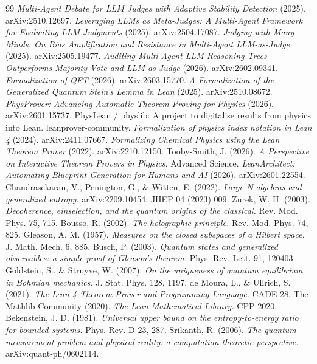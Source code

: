 \documentclass[11pt]{article}
\begin{document}
\begin{thebibliography}{99}
 \emph{Multi-Agent Debate for LLM Judges with Adaptive Stability Detection} (2025). arXiv:2510.12697.
 \emph{Leveraging LLMs as Meta-Judges: A Multi-Agent Framework for Evaluating LLM Judgments} (2025). arXiv:2504.17087.
 \emph{Judging with Many Minds: On Bias Amplification and Resistance in Multi-Agent LLM-as-Judge} (2025). arXiv:2505.19477.
 \emph{Auditing Multi-Agent LLM Reasoning Trees Outperforms Majority Vote and LLM-as-Judge} (2026). arXiv:2602.09341.
 \emph{Formalization of QFT} (2026). arXiv:2603.15770.
 \emph{A Formalization of the Generalized Quantum Stein's Lemma in Lean} (2025). arXiv:2510.08672.
 \emph{PhysProver: Advancing Automatic Theorem Proving for Physics} (2026). arXiv:2601.15737.
 PhysLean / physlib: A project to digitalise results from physics into Lean. leanprover-community.
 \emph{Formalization of physics index notation in Lean 4} (2024). arXiv:2411.07667.
 \emph{Formalizing Chemical Physics using the Lean Theorem Prover} (2022). arXiv:2210.12150.
 Tooby-Smith, J. (2026). \emph{A Perspective on Interactive Theorem Provers in Physics.} Advanced Science.
 \emph{LeanArchitect: Automating Blueprint Generation for Humans and AI} (2026). arXiv:2601.22554.
 Chandrasekaran, V., Penington, G., \& Witten, E. (2022). \emph{Large N algebras and generalized entropy.} arXiv:2209.10454; JHEP 04 (2023) 009.
 Zurek, W. H. (2003). \emph{Decoherence, einselection, and the quantum origins of the classical.} Rev. Mod. Phys. 75, 715.
 Bousso, R. (2002). \emph{The holographic principle.} Rev. Mod. Phys. 74, 825.
 Gleason, A. M. (1957). \emph{Measures on the closed subspaces of a Hilbert space.} J. Math. Mech. 6, 885.
 Busch, P. (2003). \emph{Quantum states and generalized observables: a simple proof of Gleason's theorem.} Phys. Rev. Lett. 91, 120403.
 Goldstein, S., \& Struyve, W. (2007). \emph{On the uniqueness of quantum equilibrium in Bohmian mechanics.} J. Stat. Phys. 128, 1197.
 de Moura, L., \& Ullrich, S. (2021). \emph{The Lean 4 Theorem Prover and Programming Language.} CADE-28.
 The Mathlib Community (2020). \emph{The Lean Mathematical Library.} CPP 2020.
 Bekenstein, J. D. (1981). \emph{Universal upper bound on the entropy-to-energy ratio for bounded systems.} Phys. Rev. D 23, 287.
 Srikanth, R. (2006). \emph{The quantum measurement problem and physical reality: a computation theoretic perspective.} arXiv:quant-ph/0602114.

\end{thebibliography}
\end{document}
